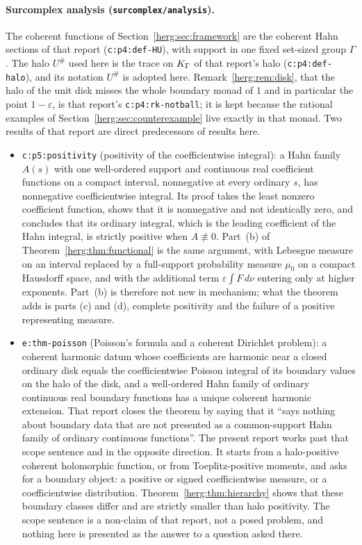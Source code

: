 \documentclass[11pt,letterpaper]{article}
\theoremstyle{definition}
\newcommand{\eps}{\varepsilon}
\newcommand{\dd}{\,d}
\newcommand{\halo}[1]{#1^{\#}}
\newcommand{\repo}[1]{\nolinkurl{#1}}%
\newcommand{\lbl}[1]{\nolinkurl{#1}}%
\numberwithin{equation}{section}
\begin{document}
\paragraph{Surcomplex analysis (\repo{surcomplex/analysis}).}
The coherent functions of Section~\ref{herg:sec:framework} are the coherent Hahn sections of that report (\lbl{c:p4:def-HU}), with support in one fixed set-sized group $\Gamma$. The halo $\halo U$ used here is the trace on $K_\Gamma$ of that report's halo (\lbl{c:p4:def-halo}), and its notation $\halo U$ is adopted here. Remark~\ref{herg:rem:disk}, that the halo of the unit disk misses the whole boundary monad of $1$ and in particular the point $1-\eps$, is that report's \lbl{c:p4:rk-notball}; it is kept because the rational examples of Section~\ref{herg:sec:counterexample} live exactly in that monad. Two results of that report are direct predecessors of results here.
\begin{itemize}
\item \lbl{c:p5:positivity} (positivity of the coefficientwise integral): a Hahn family $A(s)$ with one well-ordered support and continuous real coefficient functions on a compact interval, nonnegative at every ordinary $s$, has nonnegative coefficientwise integral. Its proof takes the least nonzero coefficient function, shows that it is nonnegative and not identically zero, and concludes that its ordinary integral, which is the leading coefficient of the Hahn integral, is strictly positive when $A\not\equiv0$. Part~(b) of Theorem~\ref{herg:thm:functional} is the same argument, with Lebesgue measure on an interval replaced by a full-support probability measure $\mu_0$ on a compact Hausdorff space, and with the additional term $\eps\int F\dd\nu$ entering only at higher exponents. Part~(b) is therefore not new in mechanism; what the theorem adds is parts (c) and (d), complete positivity and the failure of a positive representing measure.
\item \lbl{e:thm-poisson} (Poisson's formula and a coherent Dirichlet problem): a coherent harmonic datum whose coefficients are harmonic near a closed ordinary disk equals the coefficientwise Poisson integral of its boundary values on the halo of the disk, and a well-ordered Hahn family of ordinary continuous real boundary functions has a unique coherent harmonic extension. That report closes the theorem by saying that it ``says nothing about boundary data that are not presented as a common-support Hahn family of ordinary continuous functions''. The present report works past that scope sentence and in the opposite direction. It starts from a halo-positive coherent holomorphic function, or from Toeplitz-positive moments, and asks for a boundary object: a positive or signed coefficientwise measure, or a coefficientwise distribution. Theorem~\ref{herg:thm:hierarchy} shows that these boundary classes differ and are strictly smaller than halo positivity. The scope sentence is a non-claim of that report, not a posed problem, and nothing here is presented as the answer to a question asked there.
\end{itemize}
\end{document}
